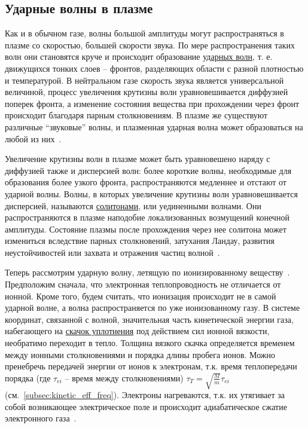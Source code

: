 \documentclass[10pt, a4paper]{article}
\begin{document}
\subsection{Ударные волны в плазме}

Как и в обычном газе, волны большой амплитуды могут распространяться в плазме со скоростью, большей скорости звука. По мере распространения таких волн они становятся круче и происходит образование \uline{ударных волн}, т. е. движущихся тонких слоев -- фронтов, разделяющих области с разной плотностью и температурой. В нейтральном газе скорость звука является универсальной величиной, процесс увеличения крутизны волн уравновешивается диффузией поперек фронта, а изменение состояния вещества при прохождении через фронт происходит благодаря парным столкновениям. В плазме же существуют различные ``звуковые'' волны, и плазменная ударная волна может образоваться на любой из них~\cite{kroll}.

Увеличение крутизны волн в плазме может быть уравновешено наряду с диффузией также и дисперсией волн: более короткие волны, необходимые для образования более узкого фронта, распространяются медленнее и отстают от ударной волны. Волны, в которых увеличение крутизны волн уравновешивается дисперсией, называются \uline{солитонами}, или уединенными волнами. Они распространяются в плазме наподобие локализованных возмущений конечной амплитуды. Состояние плазмы после прохождения через нее солитона может измениться вследствие парных столкновений, затухания Ландау, развития неустойчивостей или захвата и отражения частиц волной~\cite{kroll}.

Теперь рассмотрим ударную волну, летящую по ионизированному веществу~\cite{zeldovich}. Предположим сначала, что электронная теплопроводность не отличается от ионной. Кроме того, будем считать, что ионизация происходит не в самой ударной волне, а волна
распространяется по уже ионизованному газу. В системе координат, связанной с волной, значительная часть кинетической энергии газа, набегающего на \uline{скачок уплотнения} под действием сил ионной вязкости, необратимо переходит в тепло. Толщина вязкого скачка определяется временем между ионными столкновениями и порядка длины пробега ионов. Можно пренебречь передачей энергии от ионов к электронам, т.к. время теплопередачи порядка (где $\tau_{ei}$ -- время между столкновениями) $\tau_T=\sqrt{\frac{M}{m}}\tau_{ei}$ (см.~\ref{subsec:kinetic_eff_freq}). Электроны нагреваются, т.к. их утягивает за собой возникающее электрическое поле и происходит адиабатическое сжатие электронного газа~\cite{zeldovich}.
\end{document}
